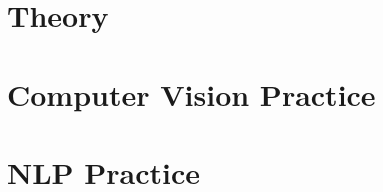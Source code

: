 \documentclass{book}
\begin{document}
\frontmatter




\mainmatter
\tableofcontents

\part{Theory}









\part{Computer Vision Practice}






\part{NLP Practice}




% 
\backmatter


\end{document}
